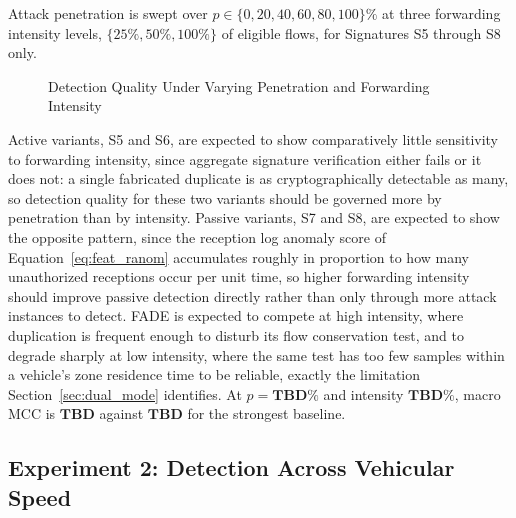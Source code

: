\documentclass[final,5p,twocolumn]{elsarticle}
\theoremstyle{remark}
\theoremstyle{plain}
\newcommand{\TBD}{\textbf{TBD}} %
\begin{document}
Attack penetration is swept over $p \in \{0,20,40,60,80,100\}\%$ at three
forwarding intensity levels, $\{25\%, 50\%, 100\%\}$ of eligible flows, for
Signatures S5 through S8 only.
\begin{figure}[!t]
	\centering
	\caption{Detection Quality Under Varying Penetration and Forwarding Intensity}
	\label{fig:exp1_mcc}
\end{figure}
Active variants, S5 and S6, are expected to show comparatively little
sensitivity to forwarding intensity, since aggregate signature verification
either fails or it does not: a single fabricated duplicate is as
cryptographically detectable as many, so detection quality for these two
variants should be governed more by penetration than by intensity. Passive
variants, S7 and S8, are expected to show the opposite pattern, since the
reception log anomaly score of Equation~\eqref{eq:feat_ranom} accumulates
roughly in proportion to how many unauthorized receptions occur per unit
time, so higher forwarding intensity should improve passive detection
directly rather than only through more attack instances to detect. FADE is
expected to compete at high intensity, where duplication is frequent enough
to disturb its flow conservation test, and to degrade sharply at low
intensity, where the same test has too few samples within a vehicle's zone
residence time to be reliable, exactly the limitation
Section~\ref{sec:dual_mode} identifies. At $p{=}\TBD\%$ and intensity
$\TBD\%$, macro MCC is $\TBD$ against $\TBD$ for the strongest baseline.

\subsection{Experiment 2: Detection Across Vehicular Speed}
\end{document}
